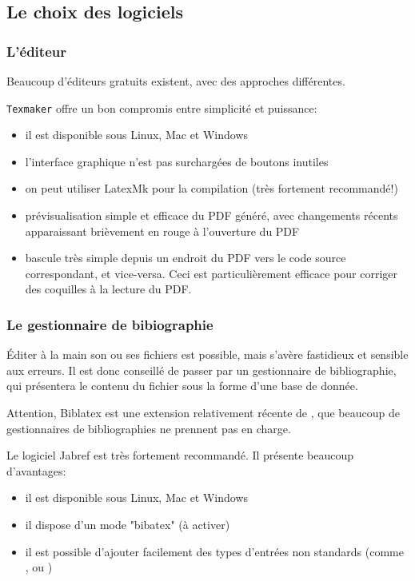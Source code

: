 \documentclass{ltxdockit}
\newcommand*{\biblatex}{Biblatex\xspace}
\begin{document}
\subsection{Le choix des logiciels}

\subsubsection{L'éditeur \latex}

Beaucoup d'éditeurs \latex gratuits existent, avec des approches différentes.

\texttt{Texmaker} offre un bon compromis entre simplicité et puissance:
\begin{itemize}
\item il est disponible sous Linux, Mac et Windows
\item l'interface graphique n'est pas surchargées de boutons inutiles
\item on peut utiliser LatexMk pour la compilation (très fortement recommandé!)
\item prévisualisation simple et efficace du PDF généré, avec changements récents apparaissant brièvement en rouge à l'ouverture du PDF
\item bascule très simple depuis un endroit du PDF vers le code source \latex correspondant, et vice-versa. Ceci  est particulièrement efficace pour corriger des coquilles à la lecture du PDF.
\end{itemize}

\subsubsection{Le gestionnaire de bibiographie}

Éditer à la main son ou ses fichiers  est possible, mais s'avère fastidieux et sensible aux erreurs. Il est donc conseillé de passer par un gestionnaire de bibliographie, qui présentera le contenu du fichier  sous la forme d'une base de donnée.

Attention, \biblatex est une extension relativement récente de \bibtex, que beaucoup de gestionnaires de bibliographies ne prennent pas en charge.

Le logiciel Jabref est très fortement recommandé. Il présente beaucoup d'avantages:
\begin{itemize}
\item il est disponible sous Linux, Mac et Windows
\item il dispose d'un mode "bibatex" (à activer)
\item il est possible d'ajouter facilement des types d'entrées non standards (comme ,  ou ) 
\end{itemize}
\end{document}
